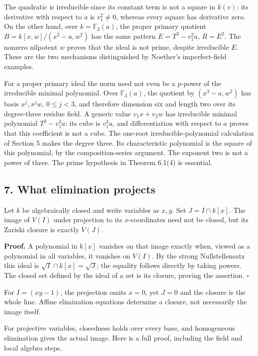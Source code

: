 \documentclass[
]{article}
\begin{document}
The quadratic is irreducible since its constant term is not a square in
\(k(v)\): its derivative with respect to \(a\) is \(v_1^2\ne0\), whereas
every square has derivative zero. On the other hand, over
\(k=\mathbb F_2(a)\), the proper primary quotient
\(B=k[x,w]/(x^2-a,w^2)\) has the same pattern \(E=T^2-v_1^2a\),
\(R=E^2\). The nonzero nilpotent \(w\) proves that the ideal is not
prime, despite irreducible \(E\). These are the two mechanisms
distinguished by Noether's imperfect-field examples.

For a proper primary ideal the norm need not even be a \(p\)-power of
the irreducible minimal polynomial. Over \(\mathbb F_3(a)\), the
quotient by \((x^3-a,w^2)\) has basis \(x^j,x^jw\), \(0\le j<3\), and
therefore dimension six and length two over its degree-three residue
field. A generic value \(v_1x+v_2w\) has irreducible minimal polynomial
\(T^3-v_1^3a\): its cube is \(v_1^3a\), and differentiation with respect
to \(a\) proves that this coefficient is not a cube. The one-root
irreducible-polynomial calculation of Section 5 makes the degree three.
Its characteristic polynomial is the square of this polynomial, by the
composition-series argument. The exponent two is not a power of three.
The prime hypothesis in Theorem 6.1(4) is essential.

\subsection{7. What elimination
projects}\label{what-elimination-projects}

Let \(k\) be algebraically closed and write variables as \(x,y\). Set
\(J=I\cap k[x]\). The image of \(V(I)\) under projection to its
\(x\)-coordinates need not be closed, but its Zariski closure is exactly
\(V(J)\).

\textbf{Proof.} A polynomial in \(k[x]\) vanishes on that image exactly
when, viewed as a polynomial in all variables, it vanishes on \(V(I)\).
By the strong Nullstellensatz this ideal is
\(\sqrt I\cap k[x]=\sqrt J\); the equality follows directly by taking
powers. The closed set defined by the ideal of a set is its closure,
proving the assertion. \(\square\)

For \(I=(xy-1)\), the projection omits \(x=0\), yet \(J=0\) and the
closure is the whole line. Affine elimination equations determine a
closure, not necessarily the image itself.

For projective variables, closedness holds over every base, and
homogeneous elimination gives the actual image. Here is a full proof,
including the field and local algebra steps.
\end{document}
